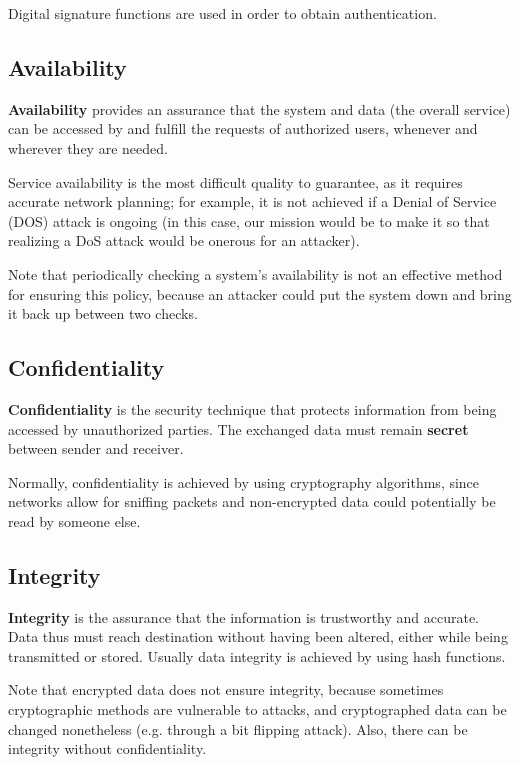 Digital signature functions are used in order to obtain authentication.


\subsection{Availability}
\textbf{Availability} provides an assurance that the system and data (the overall service) can be accessed by and fulfill the requests of authorized users, whenever and wherever they are needed.

Service availability is the most difficult quality to guarantee, as it requires accurate network planning; for example, it is not achieved if a Denial of Service (DOS) attack is ongoing (in this case, our mission would be to make it so that realizing a DoS attack would be onerous for an attacker).

Note that periodically checking a system's availability is not an effective method for ensuring this policy, because an attacker could put the system down and bring it back up between two checks.


\subsection{Confidentiality}
\textbf{Confidentiality} is the security technique that protects information from being accessed by unauthorized parties. The exchanged data must remain \textbf{secret} between sender and receiver.

Normally, confidentiality is achieved by using cryptography algorithms, since networks allow for sniffing packets and non-encrypted data could potentially be read by someone else.


\subsection{Integrity}
\textbf{Integrity} is the assurance that the information is trustworthy and accurate. Data thus must reach destination without having been altered, either while being transmitted or stored. Usually data integrity is achieved by using hash functions.

Note that encrypted data does not ensure integrity, because sometimes cryptographic methods are vulnerable to attacks, and cryptographed data can be changed nonetheless (e.g. through a bit flipping attack). Also, there can be integrity without confidentiality.

